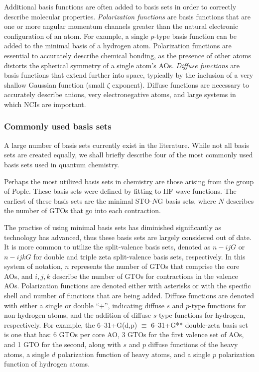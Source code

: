 Additional basis functions are often added to basis sets in order to correctly
describe molecular properties. \emph{Polarization functions} are basis
functions that are one or more angular momentum channels greater than the
natural electronic configuration of an atom. For example, a single $p$-type
basis function can be added to the minimal basis of a hydrogen atom.
Polarization functions are essential to accurately describe chemical bonding,
as the presence of other atoms distorts the spherical symmetry of a single
atom's AOs.\cite{Szabo1996} \emph{Diffuse functions} are basis functions that
extend further into space, typically by the inclusion of a very shallow
Gaussian function (small $\zeta$ exponent). Diffuse functions are necessary to
accurately describe anions, very electronegative atoms, and large systems in
which NCIs are important.

\subsubsection{Commonly used basis sets}

A large number of basis sets currently exist in the
literature.\cite{Jensen2012} While not all basis sets are created equally, we
shall briefly describe four of the most commonly used basis sets used in
quantum chemistry.

\vspace{3mm}
\vspace{1mm}

Perhaps the most utilized basis sets in chemistry are those arising from the
group of Pople.\cite{Hehre1969, Ditchfield1971, Hehre1972} These basis sets
were defined by fitting to HF wave functions. The earliest of these basis sets
are the minimal STO-$N$G basis sets, where $N$ describes the number of GTOs
that go into each contraction.

The practise of using minimal basis sets has diminished significantly as
technology has advanced, thus these basis sets are largely considered out of
date. It is more common to utilize the split-valence basis sets, denoted as
$n-ijG$ or $n-ijkG$ for double and triple zeta split-valence basis sets,
respectively. In this system of notation, $n$ represents the number of GTOs
that comprise the core AOs, and $i, j, k$ describe the number of GTOs for
contractions in the valence AOs. Polarization functions are denoted either with
asterisks or with the specific shell and number of functions that are being
added. Diffuse functions are denoted with either a single or double ``+'',
indicating diffuse $s$ and $p$-type functions for non-hydrogen atoms, and the
addition of diffuse $s$-type functions for hydrogen, respectively. For example,
the 6--31+G(d,p) $\equiv$ 6--31+G** double-zeta basis set is one that has: 6
GTOs per core AO, 3 GTOs for the first valence set of AOs, and 1 GTO for the
second, along with $s$ and $p$ diffuse functions of the heavy atoms, a single
$d$ polarization function of heavy atoms, and a single $p$ polarization
function of hydrogen atoms.

